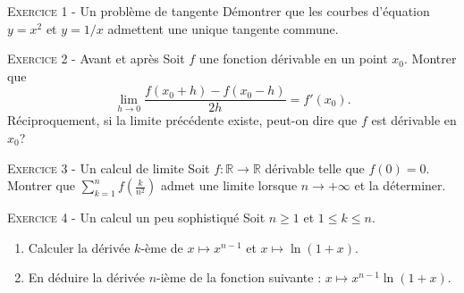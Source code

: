 

\newcommand{\mtn}{\mathbb{N}}
\newcommand{\mtns}{\mathbb{N}^*}
\newcommand{\mtz}{\mathbb{Z}}
\newcommand{\mtr}{\mathbb{R}}
\newcommand{\mtk}{\mathbb{K}}
\newcommand{\mtq}{\mathbb{Q}}
\newcommand{\mtc}{\mathbb{C}}
\newcommand{\mch}{\mathcal{H}}
\newcommand{\mcp}{\mathcal{P}}
\newcommand{\mcb}{\mathcal{B}}
\newcommand{\mcl}{\mathcal{L}}
\newcommand{\mcm}{\mathcal{M}}
\newcommand{\mcc}{\mathcal{C}}
\newcommand{\mcmn}{\mathcal{M}}
\newcommand{\mcmnr}{\mathcal{M}_n(\mtr)}
\newcommand{\mcmnk}{\mathcal{M}_n(\mtk)}
\newcommand{\mcsn}{\mathcal{S}_n}
\newcommand{\mcs}{\mathcal{S}}
\newcommand{\mcd}{\mathcal{D}}
\newcommand{\mcsns}{\mathcal{S}_n^{++}}
\newcommand{\glnk}{GL_n(\mtk)}
\newcommand{\mnr}{\mathcal{M}_n(\mtr)}
\newcommand{\veps}{\varepsilon}
\newcommand{\mcu}{\mathcal{U}}
\newcommand{\mcun}{\mcu_n}
\newcommand{\dis}{\displaystyle}
\newcommand{\croouv}{[\![}
\newcommand{\crofer}{]\!]}
\newcommand{\rab}{\mathcal{R}(a,b)}
\newcommand{\pss}[2]{\langle #1,#2\rangle}

 




\vskip0.3cm\noindent\textsc{Exercice 1} - Un problème de tangente
\vskip0.2cm
Démontrer que les courbes d'équation $y=x^2$ et $y=1/x$ admettent une unique tangente commune.




\vskip0.3cm\noindent\textsc{Exercice 2} - Avant et après
\vskip0.2cm
Soit $f$ une fonction dérivable en un point $x_0$. Montrer que
$$\lim_{h\to 0}\frac{f(x_0+h)-f(x_0-h)}{2h}=f'(x_0).$$
Réciproquement, si la limite précédente existe, peut-on dire que $f$ est dérivable en $x_0$?




\vskip0.3cm\noindent\textsc{Exercice 3} - Un calcul de limite
\vskip0.2cm
Soit $f:\mathbb R\to\mathbb R$ dérivable telle que $f(0)=0$. Montrer que
$\sum_{k=1}^n f\left(\frac k{n^2}\right)$ admet une limite lorsque $n\to+\infty$ et la déterminer.




\vskip0.3cm\noindent\textsc{Exercice 4} - Un calcul un peu sophistiqué
\vskip0.2cm
Soit $n\geq 1$ et $1\leq k\leq n$. 
\begin{enumerate}
\item Calculer la dérivée $k$-ème de $x\mapsto x^{n-1}$ et $x\mapsto \ln(1+x)$.
\item En déduire la dérivée $n$-ième de la fonction suivante :
$x\mapsto x^{n-1}\ln(1+x).$
\end{enumerate}



